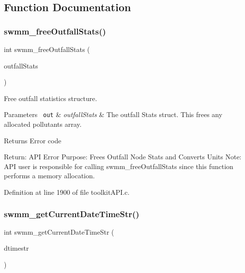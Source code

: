 \subsection{Function Documentation}
\mbox{\label{group__tkfuncs_ga24874b7dc37c161521f0c14899c2157d}} 
\subsubsection{\texorpdfstring{swmm\_freeOutfallStats()}{swmm\_freeOutfallStats()}}
{\footnotesize\ttfamily int swmm\+\_\+free\+Outfall\+Stats (\begin{DoxyParamCaption}\item[{\mbox{\hyperlink{struct_s_m___outfall_stats}{S\+M\+\_\+\+Outfall\+Stats}} $\ast$}]{outfall\+Stats }\end{DoxyParamCaption})}



Free outfall statistics structure. 


\begin{DoxyParams}[1]{Parameters}
\mbox{\texttt{ out}}  & {\em outfall\+Stats} & The outfall Stats struct. This frees any allocated pollutants array. \\
\hline
\end{DoxyParams}
\begin{DoxyReturn}{Returns}
Error code
\end{DoxyReturn}
Return\+: A\+PI Error Purpose\+: Frees Outfall Node Stats and Converts Units Note\+: A\+PI user is responsible for calling swmm\+\_\+free\+Outfall\+Stats since this function performs a memory allocation. 

Definition at line 1900 of file toolkit\+A\+P\+I.\+c.

\mbox{\label{group__tkfuncs_ga1035b4f45546c1c90da4dafda7e3677d}} 
\subsubsection{\texorpdfstring{swmm\_getCurrentDateTimeStr()}{swmm\_getCurrentDateTimeStr()}}
{\footnotesize\ttfamily int swmm\+\_\+get\+Current\+Date\+Time\+Str (\begin{DoxyParamCaption}\item[{char $\ast$}]{dtimestr }\end{DoxyParamCaption})}



